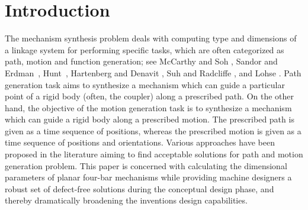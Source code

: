 \documentclass[twocolumn,10pt]{asme2ej}
\begin{document}
\section{Introduction}
The mechanism synthesis problem deals with computing type and dimensions of a linkage system for performing specific tasks, which are often categorized as path, motion and function generation; see McCarthy and Soh \cite{sohmccarthy}, Sandor and Erdman~\cite{Sandor}, Hunt~\cite{Hunt78}, Hartenberg and Denavit \cite{Hartenberg},  Suh and Radcliffe \cite{Suh78}, and Lohse \cite{lohse2013}.
Path generation task aims to synthesize a mechanism which can guide a particular point of a rigid body (often, the coupler) along a prescribed path.
On the other hand, the objective of the motion generation task is to synthesize a mechanism which can guide a rigid body along a prescribed motion.
The prescribed path is given as a time sequence of positions, whereas the prescribed motion is given as a time sequence of positions and orientations. Various approaches have been proposed in the literature aiming to find acceptable solutions for path and motion generation problem. This paper is concerned with calculating the dimensional parameters of planar four-bar mechanisms while providing machine designers a robust set of defect-free solutions during the conceptual design phase, and thereby dramatically broadening the inventions design capabilities. 
\end{document}
